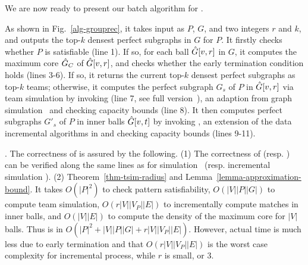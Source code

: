 We are now ready to present our batch algorithm for \teamF{}.

 As shown in Fig.~\ref{alg-grouprec}, it takes input as $P$, $G$, and two integers $r$ and $k$, and outputs the top-$k$ densest perfect subgraphs in $G$ for $P$.
It firstly checks whether $P$ is satisfiable (line 1).
If so, for each ball $\hat{G}{[v,r]}$ in $G$, it computes the maximum core $\hat{G}{}_{C}$ of $\hat{G}{[v,r]}$, and checks whether the early termination condition holds (lines 3-6).
If so, it returns the current top-$k$ densest perfect subgraphs as top-$k$ teams;
otherwise, it computes the perfect subgraph $G_{s}$ of $P$ in $\hat{G}{[v,r]}$ via team simulation by invoking \rgraphsim (line 7, see full version~\cite{fullvldb18}),
an adaption from graph simulation~\cite{infsimu95,FanLMTWW10} and checking capacity bounds (line 8).
It then computes perfect subgraphs $G'_{s}$ of $P$ in inner balls $\hat{G}{[v,t]}$ by invoking \incsim, an extension of the data incremental algorithms in \cite{FanWW13-tods} and checking capacity bounds (lines 9-11).

. The correctness of \grouprec is assured by the following.
(1) The correctness of \rgraphsim (resp. \incsim) can be verified along the same lines as for simulation~\cite{infsimu95} (resp. incremental simulation \cite{FanWW13-tods}).
(2) Theorem~\ref{thm-tsim-radius} and Lemma~\ref{lemma-approximation-bound}.
It takes $O(|P|^2)$ to check pattern satisfiability, $O(|V||P||G|)$ to compute team simulation, $O(r|V||V_{P}||E|)$ to incrementally compute matches in inner balls, and $O(|V||E|)$  to compute the density of the maximum core for $|V|$ balls.
Thus \grouprec is in $O(|P|^2+|V||P||G|+r|V||V_{P}||E|)$. However, actual time is much less due to early termination and that  $O(r|V||V_{P}||E|)$ is the worst case complexity for incremental process, while $r$ is small,  or 3.



